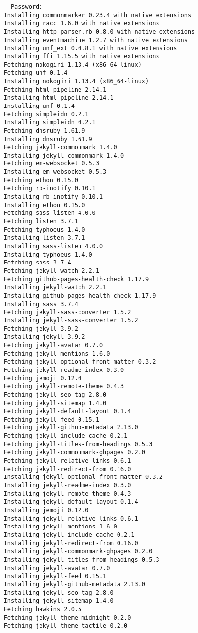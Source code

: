 \documentclass{article}
\numberwithin{equation}{section}
\begin{document}
\begin{verbatim}
	  Password: 
	Installing commonmarker 0.23.4 with native extensions
	Installing racc 1.6.0 with native extensions
	Installing http_parser.rb 0.8.0 with native extensions
	Installing eventmachine 1.2.7 with native extensions
	Installing unf_ext 0.0.8.1 with native extensions
	Installing ffi 1.15.5 with native extensions
	Fetching nokogiri 1.13.4 (x86_64-linux)
	Fetching unf 0.1.4
	Installing nokogiri 1.13.4 (x86_64-linux)
	Fetching html-pipeline 2.14.1
	Installing html-pipeline 2.14.1
	Installing unf 0.1.4
	Fetching simpleidn 0.2.1
	Installing simpleidn 0.2.1
	Fetching dnsruby 1.61.9
	Installing dnsruby 1.61.9
	Fetching jekyll-commonmark 1.4.0
	Installing jekyll-commonmark 1.4.0
	Fetching em-websocket 0.5.3
	Installing em-websocket 0.5.3
	Fetching ethon 0.15.0
	Fetching rb-inotify 0.10.1
	Installing rb-inotify 0.10.1
	Installing ethon 0.15.0
	Fetching sass-listen 4.0.0
	Fetching listen 3.7.1
	Fetching typhoeus 1.4.0
	Installing listen 3.7.1
	Installing sass-listen 4.0.0
	Installing typhoeus 1.4.0
	Fetching sass 3.7.4
	Fetching jekyll-watch 2.2.1
	Fetching github-pages-health-check 1.17.9
	Installing jekyll-watch 2.2.1
	Installing github-pages-health-check 1.17.9
	Installing sass 3.7.4
	Fetching jekyll-sass-converter 1.5.2
	Installing jekyll-sass-converter 1.5.2
	Fetching jekyll 3.9.2
	Installing jekyll 3.9.2
	Fetching jekyll-avatar 0.7.0
	Fetching jekyll-mentions 1.6.0
	Fetching jekyll-optional-front-matter 0.3.2
	Fetching jekyll-readme-index 0.3.0
	Fetching jemoji 0.12.0
	Fetching jekyll-remote-theme 0.4.3
	Fetching jekyll-seo-tag 2.8.0
	Fetching jekyll-sitemap 1.4.0
	Fetching jekyll-default-layout 0.1.4
	Fetching jekyll-feed 0.15.1
	Fetching jekyll-github-metadata 2.13.0
	Fetching jekyll-include-cache 0.2.1
	Fetching jekyll-titles-from-headings 0.5.3
	Fetching jekyll-commonmark-ghpages 0.2.0
	Fetching jekyll-relative-links 0.6.1
	Fetching jekyll-redirect-from 0.16.0
	Installing jekyll-optional-front-matter 0.3.2
	Installing jekyll-readme-index 0.3.0
	Installing jekyll-remote-theme 0.4.3
	Installing jekyll-default-layout 0.1.4
	Installing jemoji 0.12.0
	Installing jekyll-relative-links 0.6.1
	Installing jekyll-mentions 1.6.0
	Installing jekyll-include-cache 0.2.1
	Installing jekyll-redirect-from 0.16.0
	Installing jekyll-commonmark-ghpages 0.2.0
	Installing jekyll-titles-from-headings 0.5.3
	Installing jekyll-avatar 0.7.0
	Installing jekyll-feed 0.15.1
	Installing jekyll-github-metadata 2.13.0
	Installing jekyll-seo-tag 2.8.0
	Installing jekyll-sitemap 1.4.0
	Fetching hawkins 2.0.5
	Fetching jekyll-theme-midnight 0.2.0
	Fetching jekyll-theme-tactile 0.2.0

\end{verbatim}
\end{document}
